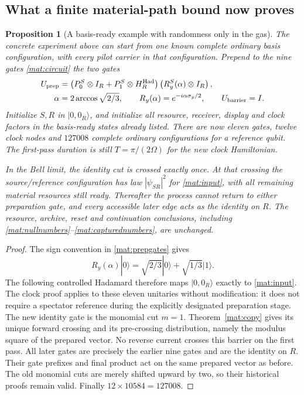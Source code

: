 \documentclass[11pt]{article}
\newtheorem{proposition}[theorem]{Proposition}
\theoremstyle{definition}\newtheorem{definition}[theorem]{Definition}
\theoremstyle{remark}\newtheorem{remark}[theorem]{Remark}
\begin{document}
\subsection{What a finite material-path bound now proves}

\begin{proposition}[A basis-ready example with randomness only in the gas]
\label{mat:basisprep}
The concrete experiment above can start from one known complete ordinary
basis configuration, with every pilot carrier in that configuration.
Prepend to the nine gates \eqref{mat:circuit} the two gates
\begin{align}\label{mat:prepgates}
 U_{\rm prep}
 &=\left(P_0^S\otimes I_R+P_1^S\otimes H_R^{\rm Had}\right)
       \left(R_y^S(\alpha)\otimes I_R\right),\\
 \alpha&=2\arccos\sqrt{2/3},\qquad
 R_y(\alpha)=e^{-i\alpha\sigma_y/2},\qquad
 U_{\rm barrier}=I.\nonumber
\end{align}
Initialize $S,R$ in $|0,0_R\rangle$, and initialize all resource,
receiver, display and clock factors in the basis-ready states already
listed.  There are now eleven gates, twelve clock nodes and $127008$
complete ordinary configurations for a reference qubit.  The first-pass
duration is still $T=\pi/(2\Omega)$ for the new clock Hamiltonian.

In the Bell limit, the identity cut is crossed exactly once.  At that
crossing the source/reference configuration has law $|\psi_{SR}|^2$
for \eqref{mat:input}, with all remaining material resources still ready.
Thereafter the process cannot return to either preparation gate, and
every accessible later edge acts as the identity on $R$.  The resource,
archive, reset and continuation conclusions, including
\eqref{mat:nullnumbers}--\eqref{mat:capturednumbers}, are unchanged.
\end{proposition}
\begin{proof}
The sign convention in \eqref{mat:prepgates} gives
\[
 R_y(\alpha)|0\rangle=\sqrt{2/3}|0\rangle+
                                \sqrt{1/3}|1\rangle.
\]
The following controlled Hadamard therefore maps $|0,0_R\rangle$
exactly to \eqref{mat:input}.  The clock proof applies to these eleven
unitaries without modification: it does not require a spectator
reference during the explicitly designated preparation stage.
The new identity gate is the monomial cut $m=1$.
Theorem~\ref{mat:copy} gives its unique forward crossing and its
pre-crossing distribution, namely the modulus square of the prepared
vector.  No reverse current crosses this barrier on the first pass.
All later gates are precisely the earlier nine gates and are the
identity on $R$.  Their gate prefixes and final product act on the
same prepared vector as before.  The old monomial cuts are merely
shifted upward by two, so their historical proofs remain valid.
Finally $12\times10584=127008$.
\end{proof}
\end{document}
